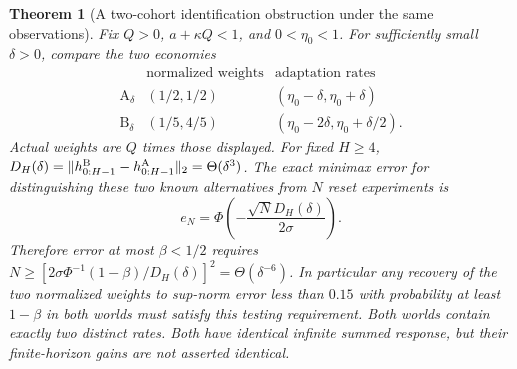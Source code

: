\documentclass[12pt]{article}
\newtheorem{theorem}{Theorem}
\theoremstyle{definition}
\theoremstyle{remark}
\begin{document}
\begin{theorem}[A two-cohort identification obstruction under the same observations]\label{fhc:pair}
Fix $Q>0$, $a+\kappa Q<1$, and $0<\eta_0<1$. For sufficiently small
$\delta>0$, compare the two economies
\[
\begin{array}{c|cc}
 &\text{normalized weights}&\text{adaptation rates}\\ \hline
\mathrm A_\delta &(1/2,1/2)&(\eta_0-\delta,\eta_0+\delta)\\
\mathrm B_\delta &(1/5,4/5)&(\eta_0-2\delta,\eta_0+\delta/2).
\end{array}
\]
Actual weights are $Q$ times those displayed. For fixed $H\ge4$,
$D_H(\delta)=\|h^{\rm B}_{0:H-1}-h^{\rm A}_{0:H-1}\|_2
=\Theta(\delta^3)$. The exact minimax error for distinguishing these
two \emph{known} alternatives from $N$ reset experiments is
\[
 e_N=\Phi\!\left(-\frac{\sqrt N D_H(\delta)}{2\sigma}\right).
\]
Therefore error at most $\beta<1/2$ requires
$N\ge[2\sigma\Phi^{-1}(1-\beta)/D_H(\delta)]^2
=\Theta(\delta^{-6})$.
In particular any recovery of the two normalized weights to sup-norm error
less than $0.15$ with probability at least $1-\beta$ in both worlds must
satisfy this testing requirement.
Both worlds contain exactly two distinct rates. Both have identical infinite
summed response, but their finite-horizon gains are not asserted identical.
\end{theorem}
\end{document}
